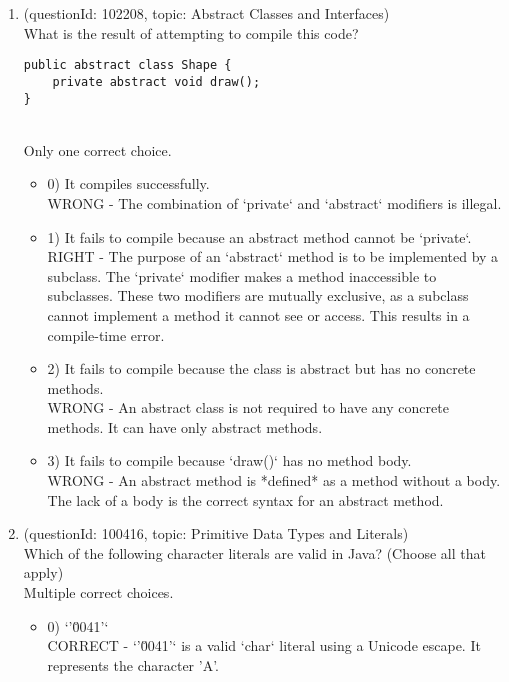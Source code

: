\documentclass[12pt]{article}
\begin{document}
\begin{enumerate}[label=(\arabic*)]
\begin{itemize}
\end{itemize}
\item (questionId: 102208, topic: Abstract Classes and Interfaces) \\ 
What is the result of attempting to compile this code?\n\begin{verbatim}
public abstract class Shape {
    private abstract void draw();
}
\end{verbatim}
\\ \noindent Only one correct choice. 
\begin{itemize}
\item 0) It compiles successfully.
 \\ 
WRONG - The combination of `private` and `abstract` modifiers is illegal.

\item 1) It fails to compile because an abstract method cannot be `private`.
 \\ 
RIGHT - The purpose of an `abstract` method is to be implemented by a subclass. The `private` modifier makes a method inaccessible to subclasses. These two modifiers are mutually exclusive, as a subclass cannot implement a method it cannot see or access. This results in a compile-time error.

\item 2) It fails to compile because the class is abstract but has no concrete methods.
 \\ 
WRONG - An abstract class is not required to have any concrete methods. It can have only abstract methods.

\item 3) It fails to compile because `draw()` has no method body.
 \\ 
WRONG - An abstract method is *defined* as a method without a body. The lack of a body is the correct syntax for an abstract method.

\end{itemize}
\item (questionId: 100416, topic: Primitive Data Types and Literals) \\ 
Which of the following character literals are valid in Java? (Choose all that apply)
\\ \noindent Multiple correct choices. 
\begin{itemize}
\item 0) `'\u0041'`
 \\ 
CORRECT - `'\u0041'` is a valid `char` literal using a Unicode escape. It represents the character 'A'.


\end{itemize}
\end{enumerate}
\end{document}
